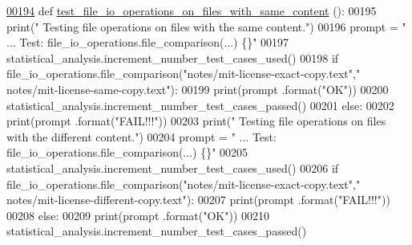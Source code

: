 \begin{DoxyCode}
\hypertarget{classutilities_1_1file__io__tester_1_1file__io__operations__tester_l00194}{}\hyperlink{classutilities_1_1file__io__tester_1_1file__io__operations__tester_a5efc5f988841df586d1db5619d5fe49e}{00194}     \textcolor{keyword}{def }\hyperlink{classutilities_1_1file__io__tester_1_1file__io__operations__tester_a5efc5f988841df586d1db5619d5fe49e}{test\_file\_io\_operations\_on\_files\_with\_same\_content}
      ():
00195         print(\textcolor{stringliteral}{" Testing file operations on files with the same content."})
00196         prompt = \textcolor{stringliteral}{"  ... Test: file\_io\_operations.file\_comparison(...)   \{\}"}
00197         statistical\_analysis.increment\_number\_test\_cases\_used()
00198         \textcolor{keywordflow}{if} file\_io\_operations.file\_comparison(\textcolor{stringliteral}{"notes/mit-license-exact-copy.text"},\textcolor{stringliteral}{"
      notes/mit-license-same-copy.text"}):
00199             print(prompt .format(\textcolor{stringliteral}{"OK"}))
00200             statistical\_analysis.increment\_number\_test\_cases\_passed()
00201         \textcolor{keywordflow}{else}:
00202             print(prompt .format(\textcolor{stringliteral}{"FAIL!!!"}))
00203         print(\textcolor{stringliteral}{" Testing file operations on files with the different content."})
00204         prompt = \textcolor{stringliteral}{"  ... Test: file\_io\_operations.file\_comparison(...)   \{\}"}
00205         statistical\_analysis.increment\_number\_test\_cases\_used()
00206         \textcolor{keywordflow}{if} file\_io\_operations.file\_comparison(\textcolor{stringliteral}{"notes/mit-license-exact-copy.text"},\textcolor{stringliteral}{"
      notes/mit-license-different-copy.text"}):
00207             print(prompt .format(\textcolor{stringliteral}{"FAIL!!!"}))
00208         \textcolor{keywordflow}{else}:
00209             print(prompt .format(\textcolor{stringliteral}{"OK"}))
00210             statistical\_analysis.increment\_number\_test\_cases\_passed()
\end{DoxyCode}
\hypertarget{classutilities_1_1file__io__tester_1_1file__io__operations__tester_a7fa460b989d5a77396a182df39255eba}{}
